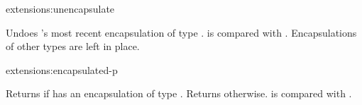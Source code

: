 \begin{defun}{extensions:}{unencapsulate}{}
  
  Undoes 's most recent encapsulation of type .
   is compared with .  Encapsulations of other
  types are left in place.
\end{defun}

\begin{defun}{extensions:}{encapsulated-p}{%
    }
  
  Returns \true{} if  has an encapsulation of type
  .  Returns \nil{} otherwise.   is compared with
  .
\end{defun}

% 
%   
%   
%   
%   
%   
%   
%   
%   
%   
